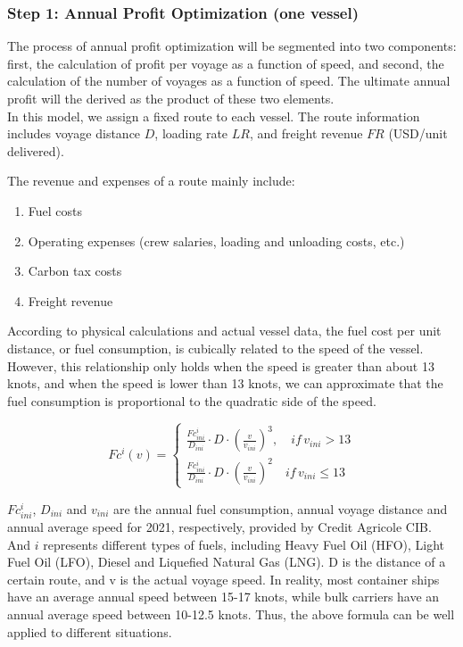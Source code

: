 \documentclass[a4paper,12pt]{article}
\begin{document}
\subsubsection{Step 1: Annual Profit Optimization (one vessel)}

The process of annual profit optimization will be segmented into two components: first, the calculation of profit per voyage as a function of speed, and second, the calculation of the number of voyages as a function of speed.
The ultimate annual profit will the derived as the product of these two elements.\\

In this model, we assign a fixed route to each vessel. The route information includes voyage distance $D$, loading rate $LR$, and freight revenue $FR$ (USD/unit delivered).

The revenue and expenses of a route mainly include:
\begin{enumerate}
	\item Fuel costs
	\item Operating expenses (crew salaries, loading and unloading costs, etc.)
	\item Carbon tax costs
	\item Freight revenue
\end{enumerate}

According to physical calculations and actual vessel data, the fuel cost per unit distance, or fuel consumption, is cubically related to the speed of the vessel.
However, this relationship only holds when the speed is greater than about 13 knots, and when the speed is lower than 13 knots, we can approximate that the fuel consumption is proportional to the quadratic side of the speed.

\begin{equation}
	\label{eq:fuel_consumption}
	Fc^i(v) =
	\left\{
	\begin{aligned}
		\frac{Fc^i_{ini}}{D_{ini}} \cdot D \cdot (\frac{v}{v_{ini}})^3, \quad if \, v_{ini} > 13 \\
		\frac{Fc^i_{ini}}{D_{ini}} \cdot D \cdot (\frac{v}{v_{ini}})^2 \quad if \, v_{ini} \leq 13
	\end{aligned}
	\right.
\end{equation}

$Fc^i_{ini}$, $D_{ini}$ and $v_{ini}$ are the annual fuel consumption, annual voyage distance and annual average speed for 2021, respectively, provided by Credit Agricole CIB.
And $i$ represents different types of fuels, including Heavy Fuel Oil (HFO), Light Fuel Oil (LFO), Diesel and Liquefied Natural Gas (LNG). D is the distance of a certain route, and v is the actual voyage speed.
In reality, most container ships have an average annual speed between 15-17 knots, while bulk carriers have an annual average speed between 10-12.5 knots.
Thus, the above formula can be well applied to different situations.\\
\end{document}
